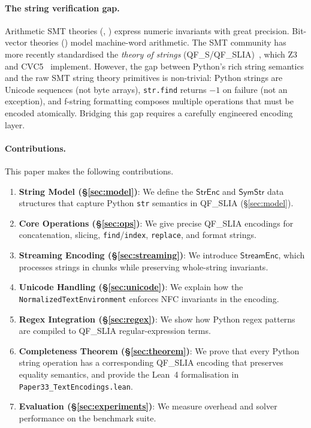 \documentclass[11pt]{article}
\newcommand{\StrEnc}{\ensuremath{\mathsf{StrEnc}}}
\newcommand{\SymStr}{\ensuremath{\mathsf{SymStr}}}
\newcommand{\StreamEnc}{\ensuremath{\mathsf{StreamEnc}}}
\newcommand{\QFSLIA}{\textsf{QF\_SLIA}}
\newcommand{\QFS}{\textsf{QF\_S}}
\begin{document}
\paragraph{The string verification gap.}
Arithmetic SMT theories (\QFLIA, \QFLRA) express numeric invariants with
great precision.  Bit-vector theories (\QFBV) model machine-word arithmetic.
The SMT community has more recently standardised the \emph{theory of strings}
(\QFS{}/\QFSLIA)~\cite{smtlib-strings}, which Z3~\cite{z3} and
CVC5~\cite{cvc5} implement.  However, the gap between Python's rich string
semantics and the raw SMT string theory primitives is non-trivial: Python
strings are Unicode sequences (not byte arrays), \texttt{str.find} returns
$-1$ on failure (not an exception), and f-string formatting composes multiple
operations that must be encoded atomically.  Bridging this gap requires a
carefully engineered encoding layer.

\paragraph{Contributions.}
This paper makes the following contributions.
\begin{enumerate}
  \item \textbf{String Model (\S\ref{sec:model})}: We define the \StrEnc{}
    and \SymStr{} data structures that capture Python \texttt{str} semantics
    in \QFSLIA{} (\S\ref{sec:model}).

  \item \textbf{Core Operations (\S\ref{sec:ops})}: We give precise \QFSLIA{}
    encodings for concatenation, slicing, \texttt{find}/\texttt{index},
    \texttt{replace}, and format strings.

  \item \textbf{Streaming Encoding (\S\ref{sec:streaming})}: We introduce
    \StreamEnc{}, which processes strings in chunks while preserving
    whole-string invariants.

  \item \textbf{Unicode Handling (\S\ref{sec:unicode})}: We explain how the
    \texttt{NormalizedTextEnvironment} enforces NFC invariants in the
    encoding.

  \item \textbf{Regex Integration (\S\ref{sec:regex})}: We show how Python
    regex patterns are compiled to \QFSLIA{} regular-expression terms.

  \item \textbf{Completeness Theorem (\S\ref{sec:theorem})}: We prove that
    every Python string operation has a corresponding \QFSLIA{} encoding that
    preserves equality semantics, and provide the Lean~4 formalisation in
    \texttt{Paper33\_TextEncodings.lean}.

  \item \textbf{Evaluation (\S\ref{sec:experiments})}: We measure overhead and
    solver performance on the \JuGeo{} benchmark suite.
\end{enumerate}
\end{document}
